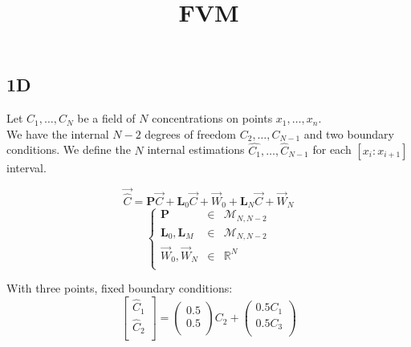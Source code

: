 \documentclass[aps,onecolumn]{revtex4}
\begin{document}
\title{FVM}
\maketitle

\subsection{1D}

\noindent Let $C_1,\ldots,C_N$ be a field of $N$ concentrations on points $x_1,\ldots,x_n$.\\
We have the internal $N-2$ degrees of freedom $C_2,\ldots,C_{N-1}$
and two boundary conditions.
We define the $N$ internal estimations $\hat{C_1},\ldots,\hat{C}_{N-1}$ for each $[x_{i}:x_{i+1}]$ interval.

\begin{equation}
	\vec{\hat{C}} = \bm{P} \vec{C} + \bm{L}_0 \vec{C} + \vec{W}_0 + \bm{L}_N \vec{C} + \vec{W}_N
\end{equation}
\begin{equation}
\left\lbrace
\begin{array}{rcl}
	\bm{P} & \in & \mathcal{M}_{N,N-2}\\
	\bm{L}_0,\bm{L}_M &\in& \mathcal{M}_{N,N-2}\\
	\vec{W}_0, \vec{W}_N &\in& \mathbb{R}^N\\
\end{array}
\right.
\end{equation}

With three points, fixed boundary conditions:
\begin{equation}
\begin{bmatrix}
\hat{C}_1\\
\hat{C}_2\\
\end{bmatrix}
= 
\begin{pmatrix}
	0.5 \\
	0.5 \\
\end{pmatrix}
C_2
+
\begin{pmatrix}
	0.5 C_1 \\
	0.5 C_3 \\
\end{pmatrix}
\end{equation}
\end{document}
